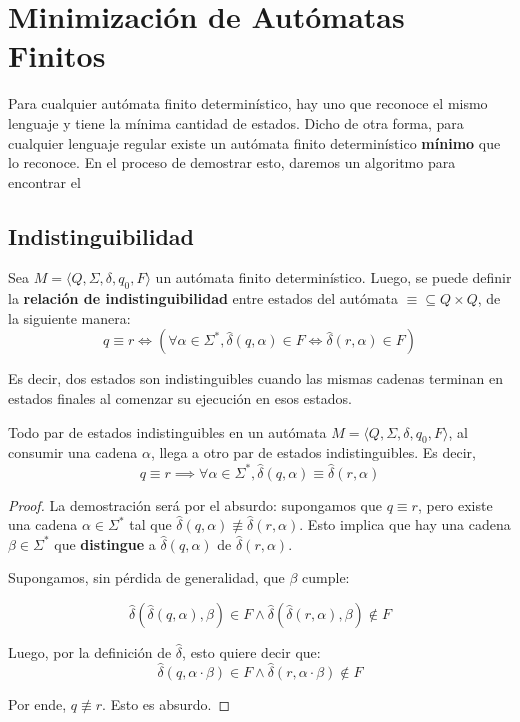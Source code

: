 \section{Minimización de Autómatas Finitos}

Para cualquier autómata finito determinístico, hay uno que reconoce el mismo lenguaje y tiene la mínima cantidad de estados. Dicho de otra forma, para cualquier lenguaje regular existe un autómata finito determinístico \textbf{mínimo} que lo reconoce. En el proceso de demostrar esto, daremos un algoritmo para encontrar el

\subsection{Indistinguibilidad}

Sea $M = \langle Q, \Sigma, \delta, q_0, F \rangle$ un autómata finito determinístico. Luego, se puede definir la \textbf{relación de indistinguibilidad} entre estados del autómata $\mathop\equiv \subseteq Q \times Q$, de la siguiente manera:
$$
    q \equiv r \iff (\forall \alpha \in \Sigma^*, \hat \delta(q, \alpha) \in F \iff \hat \delta(r, \alpha) \in F)
$$

Es decir, dos estados son indistinguibles cuando las mismas cadenas terminan en estados finales al comenzar su ejecución en esos estados.

\label{estados-indistinguibles-lema-cadenas}
\begin{lemma*}
    Todo par de estados indistinguibles en un autómata $M = \langle Q, \Sigma, \delta, q_0, F \rangle$, al consumir una cadena $\alpha$, llega a otro par de estados indistinguibles. Es decir,
    $$
        q \equiv r \implies \forall \alpha \in \Sigma^*, \hat \delta(q, \alpha) \equiv \hat \delta(r, \alpha)
    $$
\end{lemma*}
\begin{proof}
    La demostración será por el absurdo: supongamos que $q \equiv r$, pero existe una cadena $\alpha \in \Sigma^*$ tal que $\hat \delta(q, \alpha) \not\equiv \hat \delta(r, \alpha)$. Esto implica que hay una cadena $\beta \in \Sigma^*$ que \textbf{distingue} a $\hat \delta(q, \alpha)$ de $\hat \delta(r, \alpha)$.

    Supongamos, sin pérdida de generalidad, que $\beta$ cumple:

    $$
        \hat \delta(\hat \delta(q, \alpha), \beta) \in F \land \hat \delta(\hat \delta(r, \alpha), \beta) \notin F
    $$

    Luego, por la definición de $\hat \delta$, esto quiere decir que:
    $$
        \hat \delta(q, \alpha \cdot \beta) \in F \land \hat \delta(r, \alpha \cdot \beta) \notin F
    $$

    Por ende, $q \not\equiv r$. Esto es absurdo.
\end{proof}

